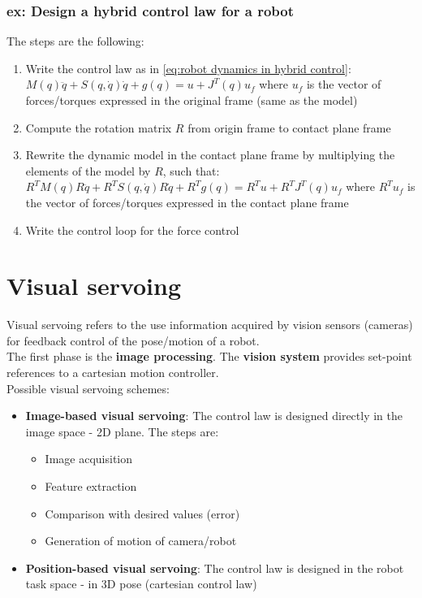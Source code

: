 \documentclass[a4paper,12pt]{article}
\begin{document}
\subsubsection{ex: Design a hybrid control law for a robot}
The steps are the following:
\begin{enumerate}
    \item Write the control law as in \ref{eq:robot dynamics in hybrid control}:
    $M(q)\ddot{q}+S(q,\dot{q})\dot{q}+g(q)=u+J^T(q)u_f$
    where $u_f$ is the vector of forces/torques expressed 
    in the original frame (same as the model)
    \item Compute the rotation matrix $R$ from origin frame to contact plane frame 
    \item Rewrite the dynamic model in the contact plane frame
    by multiplying the elements of the model by $R$, such that:
    $R^TM(q)R\ddot{q}+R^TS(q,\dot{q}) R\dot{q}+R^Tg(q)=R^Tu + R^TJ^T(q)u_f$
    where $R^T u_f$ is the vector of forces/torques expressed in the contact plane frame
    \item Write the control loop for the force control
\end{enumerate}





\section{Visual servoing}
Visual servoing refers to the
use information acquired by vision sensors (cameras)
for feedback control of the pose/motion of a robot.\\
The first phase is the \textbf{image processing}.
The \textbf{vision system} provides set-point references to a cartesian 
motion controller.\\
Possible visual servoing schemes:
\begin{itemize}
    \item \textbf{Image-based visual servoing}: The control law
     is designed directly in the image space - 2D plane.
      The steps are: \begin{itemize}
        \item Image acquisition 
        \item Feature extraction
        \item Comparison with desired values (error)
        \item Generation of motion of camera/robot
      \end{itemize}
    \item \textbf{Position-based visual servoing}: The control 
    law is designed
    in the robot task space - in 3D pose (cartesian control law)
\end{itemize}
\end{document}
